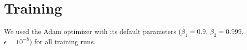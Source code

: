 \documentclass{article}
\theoremstyle{definition} \newtheorem{definition}{Definition}  \newtheorem{example}{Example}
\theoremstyle{remark} \newtheorem{remark}{Remark}
\newcounter{ct}
\begin{document}
%
%
%
%
%
%
%
%




\section{Training}
We used the Adam optimizer \citep{kingma2014adam} with its default parameters ($\beta_1 = 0.9$, $\beta_2 = 0.999$, $\epsilon = 10^{-8}$) for all training runs.


%
\end{document}
